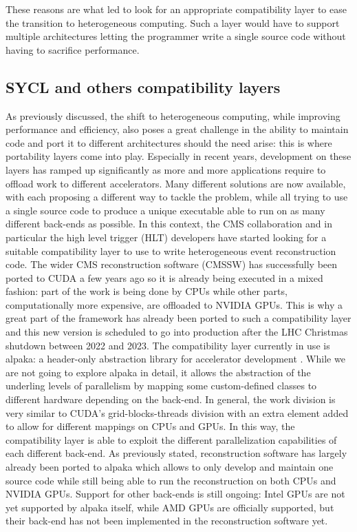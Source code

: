 These reasons are what led to look for an appropriate compatibility layer to ease the transition to heterogeneous computing. Such a layer would have to support multiple architectures letting the programmer write a single source code without having to sacrifice performance. 

\subsection{SYCL and others compatibility layers}
As previously discussed, the shift to heterogeneous computing, while improving performance and efficiency, also poses a great challenge in the ability to maintain code and port it to different architectures should the need arise: this is where portability layers come into play. Especially in recent years, development on these layers has ramped up significantly as more and more applications require to offload work to different accelerators. Many different solutions are now available, with each proposing a different way to tackle the problem, while all trying to use a single source code to produce a unique executable able to run on as many different back-ends as possible. In this context, the CMS collaboration and in particular the high level trigger (HLT) developers have started looking for a suitable compatibility layer to use to write heterogeneous event reconstruction code. The wider CMS reconstruction software (CMSSW) has successfully been ported to CUDA a few years ago so it is already being executed in a mixed fashion: part of the work is being done by CPUs while other parts, computationally more expensive, are offloaded to NVIDIA GPUs. This is why a great part of the framework has already been ported to such a compatibility layer and this new version is scheduled to go into production after the LHC Christmas shutdown between 2022 and 2023. The compatibility layer currently in use is alpaka: a header-only abstraction library for accelerator development \cite{alpaka}. While we are not going to explore alpaka in detail, it allows the abstraction of the underling levels of parallelism by mapping some custom-defined classes to different hardware depending on the back-end. In general, the work division is very similar to CUDA's grid-blocks-threads division with an extra element added to allow for different mappings on CPUs and GPUs. In this way, the compatibility layer is able to exploit the different parallelization capabilities of each different back-end. As previously stated, reconstruction software has largely already been ported to alpaka which allows to only develop and maintain one source code while still being able to run the reconstruction on both CPUs and NVIDIA GPUs. Support for other back-ends is still ongoing: Intel GPUs are not yet supported by alpaka itself, while AMD GPUs are officially supported, but their back-end has not been implemented in the reconstruction software yet.

